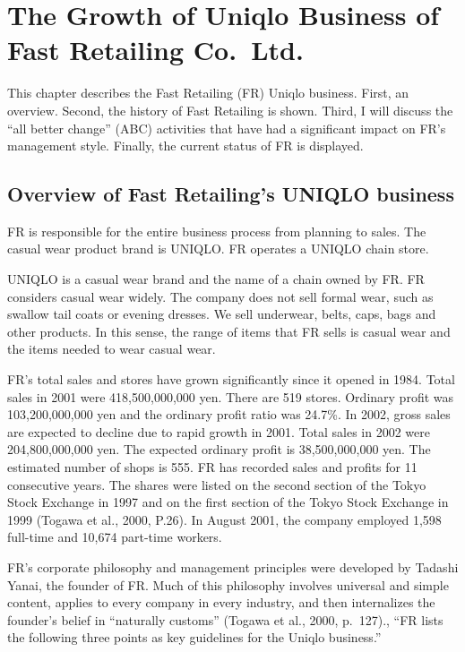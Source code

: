 \documentclass[12pt,a4paper]{article}
\begin{document}
\hypertarget{the-growth-of-uniqlo-business-of-fast-retailing-co.ltd.}{%
\section{The Growth of Uniqlo Business of Fast Retailing
Co.~Ltd.}\label{the-growth-of-uniqlo-business-of-fast-retailing-co.ltd.}}

This chapter describes the Fast Retailing (FR) Uniqlo business. First,
an overview. Second, the history of Fast Retailing is shown. Third, I
will discuss the ``all better change'' (ABC) activities that have had a
significant impact on FR's management style. Finally, the current status
of FR is displayed.

\hypertarget{overview-of-fast-retailings-uniqlo-business}{%
\subsection{Overview of Fast Retailing's UNIQLO
business}\label{overview-of-fast-retailings-uniqlo-business}}

FR is responsible for the entire business process from planning to
sales. The casual wear product brand is UNIQLO. FR operates a UNIQLO
chain store.

UNIQLO is a casual wear brand and the name of a chain owned by FR. FR
considers casual wear widely. The company does not sell formal wear,
such as swallow tail coats or evening dresses. We sell underwear, belts,
caps, bags and other products. In this sense, the range of items that FR
sells is casual wear and the items needed to wear casual wear.

FR's total sales and stores have grown significantly since it opened in
1984. Total sales in 2001 were 418,500,000,000 yen. There are 519
stores. Ordinary profit was 103,200,000,000 yen and the ordinary profit
ratio was 24.7\%. In 2002, gross sales are expected to decline due to
rapid growth in 2001. Total sales in 2002 were 204,800,000,000 yen. The
expected ordinary profit is 38,500,000,000 yen. The estimated number of
shops is 555. FR has recorded sales and profits for 11 consecutive
years. The shares were listed on the second section of the Tokyo Stock
Exchange in 1997 and on the first section of the Tokyo Stock Exchange in
1999 (Togawa et al., 2000, P.26). In August 2001, the company employed
1,598 full-time and 10,674 part-time workers.

FR's corporate philosophy and management principles were developed by
Tadashi Yanai, the founder of FR. Much of this philosophy involves
universal and simple content, applies to every company in every
industry, and then internalizes the founder's belief in ``naturally
customs'' (Togawa et al., 2000, p.~127)., ``FR lists the following three
points as key guidelines for the Uniqlo business.''
\end{document}
